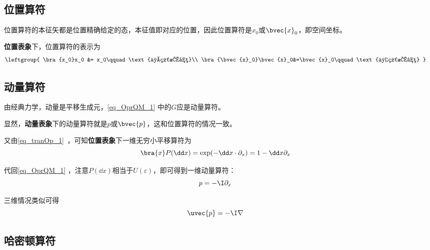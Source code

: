 \subsection{位置算符}

位置算符的本征矢都是位置精确给定的态，本征值即对应的位置，因此位置算符是$x_0$或$\bvec{x}_0$，即空间坐标。

\textbf{位置表象}下，位置算符的表示为
\begin{equation}
\leftgroup{
    \bra{x_0}x_0 &= x_0\qquad\text{一维情况}\\
    \bra{\bvec{x}_0}\bvec{x}_0&=\bvec{x}_0\qquad\text{三维情况}
    }
\end{equation}







\subsection{动量算符}


由经典力学，动量是平移生成元，\autoref{eq_OprQM_1} 中的$G$应是动量算符。

显然，\textbf{动量表象}下的动量算符就是$p$或$\bvec{p}$，这和位置算符的情况一致。

又由\autoref{eq_tranOp_1}~，可知\textbf{位置表象}下一维无穷小平移算符为
\begin{equation}
\bra{x}P(\dd x) = \exp(-\dd x \cdot \partial_x) = 1-\dd x\partial_x
\end{equation}

代回\autoref{eq_OprQM_1} ，注意$P(\dd x)$相当于$U(\varepsilon)$，即可得到一维动量算符：
\begin{equation}
p  = -\I\partial_x
\end{equation}

三维情况类似可得
\begin{equation}
\uvec{p} = -\I\nabla
\end{equation}




\subsection{哈密顿算符}

